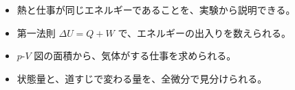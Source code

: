 \makeatletter
\newcommand\qxcpiston[4]{\begin{scope}[shift={#1}]
  \fill[bkBlue!15] (0,0) rectangle (#4,#3);
  \draw[bkInk, line width=0.9pt] (#2,0) -- (0,0) -- (0,#3) -- (#2,#3);
  \filldraw[fill=bkGray!45, draw=bkInk, line width=0.7pt] (#4,0.4) rectangle ({#4+3},{#3-0.4});
  \filldraw[fill=bkGray!45, draw=bkInk, line width=0.7pt] ({#4+3},{#3/2-0.8}) rectangle ({#2+6},{#3/2+0.8});
\end{scope}}
\makeatother
{}


\begin{goal}
\begin{itemize}[label={\color{bkTheme}●}, leftmargin=1.6\zw, itemsep=0pt, topsep=1pt]
\item {}\enspace 熱と仕事が同じエネルギーであることを、実験から説明できる。
\item {}\enspace 第一法則 $\Delta U=Q+W$ で、エネルギーの出入りを数えられる。
\item {}\enspace $p$-$V$ 図の面積から、気体がする仕事を求められる。
\item {}\enspace 状態量と、道すじで変わる量を、全微分で見分けられる。
\end{itemize}
\end{goal}

